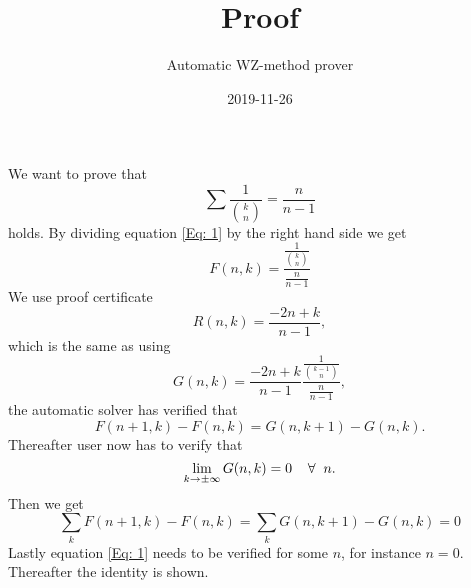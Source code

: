 \documentclass{article}
\title{Proof}
\author{Automatic WZ-method prover}
\date{2019-11-26}
\let\oldforall\forall
\renewcommand{\forall}{\hspace*{2mm}\oldforall\hspace*{1mm}}
\begin{document}
\maketitle
We want to prove that
\begin{equation}\label{Eq: 1}
\sum \frac{1}{\binom{k}{n}}=\frac{n}{n-1}
\end{equation}
holds. By dividing equation \ref{Eq: 1} by the right hand side we get
\begin{equation}
F(n,k)=\frac{\frac{1}{\binom{k}{n}}}{\frac{n}{n-1}}
\end{equation}
We use proof certificate
\begin{equation}
R(n,k)=\frac{-2n+k}{n-1},
\end{equation}
which is the same as using
\begin{equation}
G(n,k)=\frac{-2n+k}{n-1}\frac{\frac{1}{\binom{k-1}{n}}}{\frac{n}{n-1}},
\end{equation}
the automatic solver has  verified that
\begin{equation}\label{Eq: WZ1}
F(n+1,k)-F(n,k)=G(n,k+1)-G(n,k).
\end{equation}
Thereafter user now has to verify that
\begin{equation}
\lim_{k\to\pm\infty}G(n,k)=0\forall n.
\end{equation}
Then we get
\begin{equation}
\sum_k F(n+1,k)-F(n,k)=\sum_k G(n,k+1)-G(n,k)=0\end{equation}Lastly equation \ref{Eq: 1} needs to be verified for some $n$, for instance $n=0$. Thereafter the identity is shown.
\end{document}
